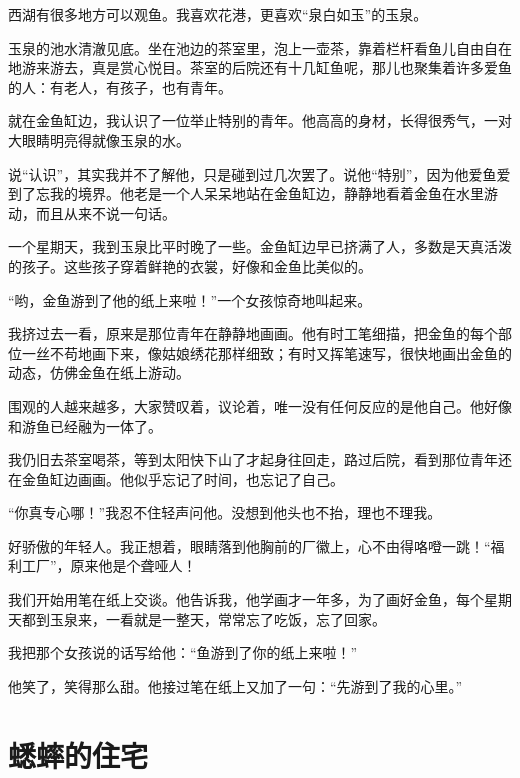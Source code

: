 \documentclass[12pt,UTF-8,openany]{ctexbook}
\begin{document}
\begin{large}
    
    西湖有很多地方可以观鱼。我喜欢花港，更喜欢“泉白如玉”的玉泉。
    
    玉泉的池水清澈见底。坐在池边的茶室里，泡上一壶茶，靠着栏杆看鱼儿自由自在地游来游去，真是赏心悦目。茶室的后院还有十几缸鱼呢，那儿也聚集着许多爱鱼的人：有老人，有孩子，也有青年。
    
    就在金鱼缸边，我认识了一位举止特别的青年。他高高的身材，长得很秀气，一对大眼睛明亮得就像玉泉的水。
    
    说“认识”，其实我并不了解他，只是碰到过几次罢了。说他“特别”，因为他爱鱼爱到了忘我的境界。他老是一个人呆呆地站在金鱼缸边，静静地看着金鱼在水里游动，而且从来不说一句话。
    
    一个星期天，我到玉泉比平时晚了一些。金鱼缸边早已挤满了人，多数是天真活泼的孩子。这些孩子穿着鲜艳的衣裳，好像和金鱼比美似的。
    
    “哟，金鱼游到了他的纸上来啦！”一个女孩惊奇地叫起来。
    
    我挤过去一看，原来是那位青年在静静地画画。他有时工笔细描，把金鱼的每个部位一丝不苟地画下来，像姑娘绣花那样细致；有时又挥笔速写，很快地画出金鱼的动态，仿佛金鱼在纸上游动。
    
    围观的人越来越多，大家赞叹着，议论着，唯一没有任何反应的是他自己。他好像和游鱼已经融为一体了。
    
    我仍旧去茶室喝茶，等到太阳快下山了才起身往回走，路过后院，看到那位青年还在金鱼缸边画画。他似乎忘记了时间，也忘记了自己。
    
    “你真专心哪！”我忍不住轻声问他。没想到他头也不抬，理也不理我。
    
    好骄傲的年轻人。我正想着，眼睛落到他胸前的厂徽上，心不由得咯噔一跳！“福利工厂”，原来他是个聋哑人！
    
    我们开始用笔在纸上交谈。他告诉我，他学画才一年多，为了画好金鱼，每个星期天都到玉泉来，一看就是一整天，常常忘了吃饭，忘了回家。
    
    我把那个女孩说的话写给他：“鱼游到了你的纸上来啦！”
    
    他笑了，笑得那么甜。他接过笔在纸上又加了一句：“先游到了我的心里。”
    
\end{large}



\chapter{蟋蟀的住宅}
\end{document}
